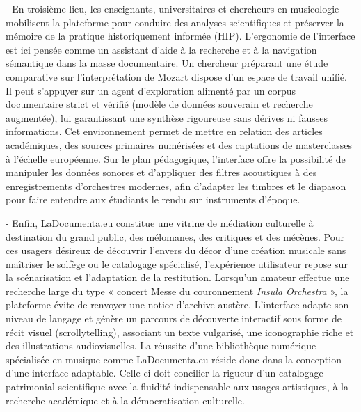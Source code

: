 - En troisième lieu, les enseignants, universitaires et chercheurs en musicologie mobilisent la plateforme pour conduire des analyses scientifiques et préserver la mémoire de la pratique historiquement informée (HIP). L'ergonomie de l'interface est ici pensée comme un assistant d'aide à la recherche et à la navigation sémantique dans la masse documentaire. Un chercheur préparant une étude comparative sur l'interprétation de Mozart dispose d'un espace de travail unifié. Il peut s’appuyer sur un agent d'exploration alimenté par un corpus documentaire strict et vérifié (modèle de données souverain et recherche augmentée), lui garantissant une synthèse rigoureuse sans dérives ni fausses informations. Cet environnement permet de mettre en relation des articles académiques, des sources primaires numérisées et des captations de masterclasses à l'échelle européenne. Sur le plan pédagogique, l'interface offre la possibilité de manipuler les données sonores et d'appliquer des filtres acoustiques à des enregistrements d'orchestres modernes, afin d'adapter les timbres et le diapason pour faire entendre aux étudiants le rendu sur instruments d'époque.

- Enfin, LaDocumenta.eu constitue une vitrine de médiation culturelle à destination du grand public, des mélomanes, des critiques et des mécènes. Pour ces usagers désireux de découvrir l'envers du décor d'une création musicale sans maîtriser le solfège ou le catalogage spécialisé, l'expérience utilisateur repose sur la scénarisation et l'adaptation de la restitution. Lorsqu'un amateur effectue une recherche large du type « concert Messe du couronnement \textit{Insula Orchestra} », la plateforme évite de renvoyer une notice d'archive austère. L'interface adapte son niveau de langage et génère un parcours de découverte interactif sous forme de récit visuel (scrollytelling), associant un texte vulgarisé, une iconographie riche et des illustrations audiovisuelles.
La réussite d'une bibliothèque numérique spécialisée en musique comme LaDocumenta.eu réside donc dans la conception d'une interface adaptable. Celle-ci doit concilier la rigueur d'un catalogage patrimonial scientifique avec la fluidité indispensable aux usages artistiques, à la recherche académique et à la démocratisation culturelle.

















